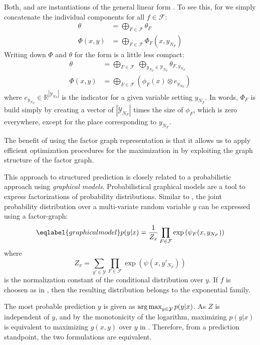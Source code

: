 Both,  and  are instantiations of the general
linear form . To see this, for  we simply
concatenate the individual components for all $f \in \mathcal{F}$:
\begin{align}
    \theta &= \bigoplus_{F \in \mathcal{F}} \theta_F\\
    \Phi(x, y) &= \bigoplus_{F \in \mathcal{F}} \Phi_F(x, y_{N_F})
\end{align}
Writing down $\Phi$ and $\theta$ for the form  is a little less compact:
\begin{align}
    \theta &= \bigoplus_{F \in \mathcal{F}}\ \bigoplus_{y_{N_F} \in \mathcal{Y}_{N_F}} \theta_{F, y_{N_F}}\\
    \Phi(x, y) &= \bigoplus_{F \in \mathcal{F}} \left (\phi_F(x) \otimes e_{y_{N_F}} \right )
\end{align}
where $e_{y_{N_F}} \in \mathbb{R}^{|\mathcal{Y}_{N_F}|}$ is the indicator for a
given variable setting $y_{N_F}$.
In words, $\Phi_F$ is build simply by creating a vector of
$|\mathcal{Y}_{N_F}|$ times the size of $\phi_F$, which is zero everywhere,
except for the place corresponding to $y_{N_F}$. %

The benefit of using the factor graph representation is that it allows us to
apply efficient optimization procedures for the maximization in
 by exploiting the graph structure of the factor graph.

This approach to structured prediction is closely related to a probabilistic
approach using \emph{graphical models}.  Probabilistical graphical models are a
tool to express factorizations of probability distributions.  Similar to
, the joint probability distribution over a
multi-variate random variable $y$ can be expressed using a factor-graph:
\begin{equation}\eqlabel{graphicalmodel}
    p(y | x) = \frac{1}{Z_x}\prod_{F \in \mathcal{F}} \exp\left(\psi_F(x, y_{N_F})\right)
\end{equation}
where
\begin{equation}
    Z_x = \sum_{y' \in \mathcal{Y}} \prod_{F \in \mathcal{F}} \exp\left(\psi(x, y'_{N_F})\right)
\end{equation}
is the normalization constant of the conditional distribution over $y$.
If $f$ is choosen as in , then the resulting distribution
belongs to the exponential family.

The most probable prediction $y$ is given as $\operatorname*{arg\,max}_{y \in \mathcal{Y}}p(y|x)$.
As $Z$ is independent of $y$, and by the monotonicity of the logarithm,
maximizing $p(y|x)$ is equivalent to maximizing $g(x,y)$ over $y$ in
. Therefore, from a prediction standpoint, the two
formulations are equivalent.

